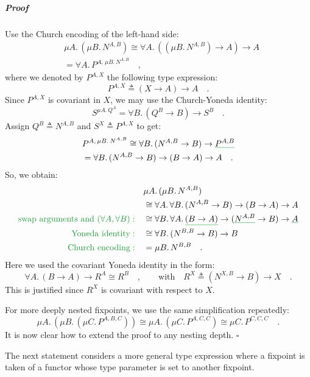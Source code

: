 \subparagraph{Proof}

Use the Church encoding of the left-hand side:
\begin{align*}
 & \mu A.\,(\mu B.\,N^{A,B})\cong\forall A.\,((\mu B.\,N^{A,B})\rightarrow A)\rightarrow A\\
 & =\forall A.\,P^{A,\,\mu B.\,N^{A,B}}\quad,
\end{align*}
where we denoted by $P^{A,X}$ the following type expression:
\[
P^{A,X}\triangleq(X\rightarrow A)\rightarrow A\quad.
\]
Since $P^{A,X}$ is covariant in $X$, we may use the Church-Yoneda
identity:
\[
S^{\mu A.\,Q^{A}}=\forall B.\,(Q^{B}\rightarrow B)\rightarrow S^{B}\quad.
\]
Assign $Q^{B}\triangleq N^{A,B}$ and $S^{X}\triangleq P^{A,X}$ to
get:
\begin{align*}
 & P^{A,\,\mu B.\,N^{A,B}}\cong\forall B.\,(N^{A,B}\rightarrow B)\rightarrow\gunderline{P^{A,B}}\\
 & =\forall B.\,(N^{A,B}\rightarrow B)\rightarrow(B\rightarrow A)\rightarrow A\quad.
\end{align*}
So, we obtain:
\begin{align*}
 & \mu A.\,(\mu B.\,N^{A,B})\\
 & \cong\forall A.\,\forall B.\,(N^{A,B}\rightarrow B)\rightarrow(B\rightarrow A)\rightarrow A\\
{\color{greenunder}\text{swap arguments and }(\forall A,\forall B):}\quad & \cong\forall B.\,\forall A.\,\gunderline{(B\rightarrow A)}\rightarrow(\gunderline{N^{A,B}}\rightarrow B)\rightarrow\gunderline A\\
{\color{greenunder}\text{Yoneda identity}:}\quad & \cong\forall B.\,(N^{B,B}\rightarrow B)\rightarrow B\\
{\color{greenunder}\text{Church encoding}:}\quad & =\mu B.\,N^{B,B}\quad.
\end{align*}
Here we used the covariant Yoneda identity in the form:
\[
\forall A.\,(B\rightarrow A)\rightarrow R^{A}\cong R^{B}\quad,\quad\quad\text{with}\quad R^{X}\triangleq(N^{X,B}\rightarrow B)\rightarrow X\quad.
\]
This is justified since $R^{X}$ is covariant with respect to $X$. 

For more deeply nested fixpoints, we use the same simplification repeatedly:
\[
\mu A.\,(\mu B.\,(\mu C.\,P^{A,B,C}))\cong\mu A.\,(\mu C.\,P^{A,C,C})\cong\mu C.\,P^{C,C,C}\quad.
\]
It is now clear how to extend the proof to any nesting depth. $\square$

The next statement considers a more general type expression where
a fixpoint is taken of a functor whose type parameter is set to another
fixpoint.

